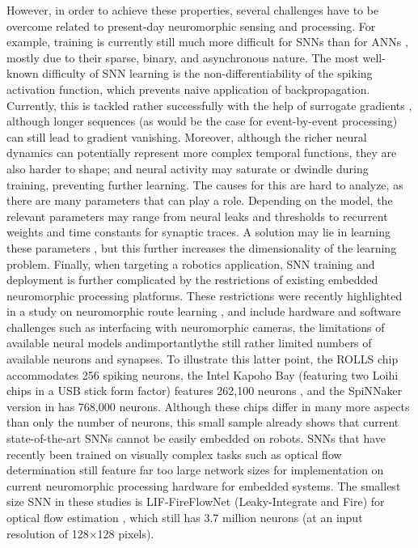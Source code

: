 However, in order to achieve these properties, several challenges have to be overcome related to present-day neuromorphic sensing and processing. For example, training is currently still much more difficult for SNNs than for ANNs \cite{pfeiffer2018deep,tavanaei2019deep}, mostly due to their sparse, binary, and asynchronous nature. The most well-known difficulty of SNN learning is the non-differentiability of the spiking activation function, which prevents naive application of backpropagation. Currently, this is tackled rather successfully with the help of surrogate gradients \cite{neftci2019surrogate,zenke2021remarkable}, although longer sequences (as would be the case for event-by-event processing) can still lead to gradient vanishing. Moreover, although the richer neural dynamics can potentially represent more complex temporal functions, they are also harder to shape; and neural activity may saturate or dwindle during training, preventing further learning. The causes for this are hard to analyze, as there are many parameters that can play a role. Depending on the model, the relevant parameters may range from neural leaks and thresholds to recurrent weights and time constants for synaptic traces. A solution may lie in learning these parameters \cite{chowdhury2021understanding,fang2021incorporating}, but this further increases the dimensionality of the learning problem. Finally, when targeting a robotics application, SNN training and deployment is further complicated by the restrictions of existing embedded neuromorphic processing platforms. These restrictions were recently highlighted in a study on neuromorphic route learning \cite{zhu2023neuromorphic}, and include hardware and software challenges such as interfacing with neuromorphic cameras, the limitations of available neural models and\textemdash importantly\textemdash the still rather limited numbers of available neurons and synapses. To illustrate this latter point, the ROLLS chip~\cite{qiao2015reconfigurable} accommodates 256 spiking neurons, the Intel Kapoho Bay (featuring two Loihi chips \cite{davies2018loihi} in a USB stick form factor) features 262,100 neurons \cite{vitale2021eventdriven}, and the SpiNNaker version in \cite{galluppi2014eventbased} has 768,000 neurons. Although these chips differ in many more aspects than only the  number of neurons, this small sample already shows that current state-of-the-art SNNs cannot be easily embedded on robots. SNNs that have recently been trained on visually complex tasks such as optical flow determination \cite{paredes-valles2020unsupervised,hagenaars2021selfsupervised} still feature far too large network sizes for implementation on current neuromorphic processing hardware for embedded systems. The smallest size SNN in these studies is LIF-FireFlowNet (Leaky-Integrate and Fire) for optical flow estimation \cite{hagenaars2021selfsupervised}, which still has 3.7 million neurons (at an input resolution of 128$\times$128 pixels).

